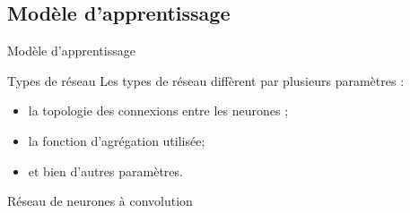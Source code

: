 \documentclass[10pt,handout]{beamer}
\newif\ifplacelogo %
\begin{document}
\placelogofalse 
\subsection{Modèle d'apprentissage}
\begin{frame}{Modèle d'apprentissage}
    \begin{block}{Types de réseau}
        Les types de réseau diffèrent par plusieurs paramètres :
        \begin{itemize}
            \item la topologie des connexions entre les neurones ;
            \item la fonction d’agrégation utilisée;
            \item et bien d’autres paramètres.
        \end{itemize}
    \end{block}

\end{frame}
\placelogotrue 

\begin{frame}{Réseau de neurones à convolution}
\end{frame}

\placelogofalse 
\end{document}
